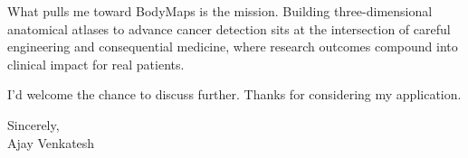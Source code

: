 \documentclass[letterpaper,11pt]{article}
\begin{document}
What pulls me toward BodyMaps is the mission. Building three-dimensional anatomical atlases to advance cancer detection sits at the intersection of careful engineering and consequential medicine, where research outcomes compound into clinical impact for real patients.

I'd welcome the chance to discuss further. Thanks for considering my application.

\vspace{12pt}
Sincerely, \\
Ajay Venkatesh
\end{document}
